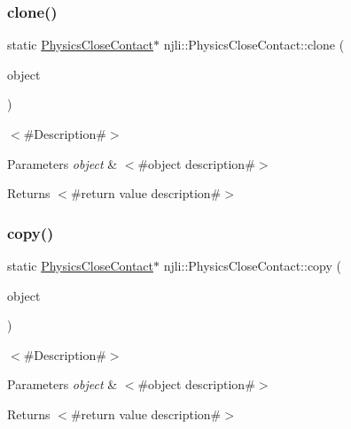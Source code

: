 \subsubsection{\texorpdfstring{clone()}{clone()}}
{\footnotesize\ttfamily static \mbox{\hyperlink{classnjli_1_1_physics_close_contact}{Physics\+Close\+Contact}}$\ast$ njli\+::\+Physics\+Close\+Contact\+::clone (\begin{DoxyParamCaption}\item[{const \mbox{\hyperlink{classnjli_1_1_physics_close_contact}{Physics\+Close\+Contact}} \&}]{object }\end{DoxyParamCaption})\hspace{0.3cm}{\ttfamily [static]}}

$<$\#\+Description\#$>$


\begin{DoxyParams}{Parameters}
{\em object} & $<$\#object description\#$>$\\
\hline
\end{DoxyParams}
\begin{DoxyReturn}{Returns}
$<$\#return value description\#$>$ 
\end{DoxyReturn}
\mbox{\label{classnjli_1_1_physics_close_contact_a845f18318e0609f18bb675ad23e9cb2d}} 
\subsubsection{\texorpdfstring{copy()}{copy()}}
{\footnotesize\ttfamily static \mbox{\hyperlink{classnjli_1_1_physics_close_contact}{Physics\+Close\+Contact}}$\ast$ njli\+::\+Physics\+Close\+Contact\+::copy (\begin{DoxyParamCaption}\item[{const \mbox{\hyperlink{classnjli_1_1_physics_close_contact}{Physics\+Close\+Contact}} \&}]{object }\end{DoxyParamCaption})\hspace{0.3cm}{\ttfamily [static]}}

$<$\#\+Description\#$>$


\begin{DoxyParams}{Parameters}
{\em object} & $<$\#object description\#$>$\\
\hline
\end{DoxyParams}
\begin{DoxyReturn}{Returns}
$<$\#return value description\#$>$ 
\end{DoxyReturn}
\mbox{\label{classnjli_1_1_physics_close_contact_a83a8876ae63b92804004cf3febe76573}} 
